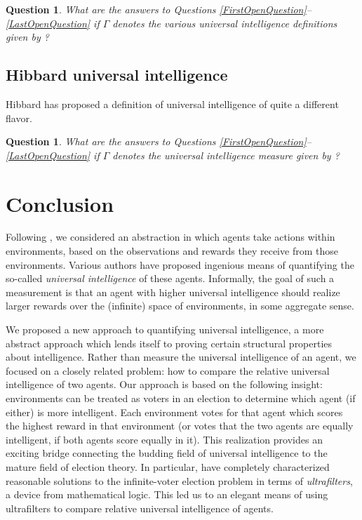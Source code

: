 \documentclass[twoside,11pt]{article}
\newtheorem{question}[theorem]{Question}
\begin{document}
\begin{question}
    What are the answers to Questions \ref{FirstOpenQuestion}--\ref{LastOpenQuestion}
    if $\varGamma$ denotes the various universal intelligence definitions
    given by \citet{hernandez}?
\end{question}


\subsection{Hibbard universal intelligence}

Hibbard has proposed \citep{hibbard} a definition of universal intelligence
of quite a different flavor.

\begin{question}
\label{ReallyLastOpenquestion}
    What are the answers to Questions \ref{FirstOpenQuestion}--\ref{LastOpenQuestion}
    if $\varGamma$ denotes the universal intelligence measure given by
    \citet{hibbard}?
\end{question}

\section{Conclusion}

Following \citet{hutter2007}, we considered an abstraction in
which agents take actions within environments, based on the observations and
rewards they receive from those environments. Various authors
\citep{hutter2007, hernandez, hibbard} have proposed
ingenious means of quantifying the so-called \emph{universal intelligence}
of these agents.
Informally, the goal of such a measurement is that
an agent with higher universal intelligence should realize larger rewards
over the (infinite) space of environments, in some aggregate
sense.

We proposed a new approach to quantifying universal intelligence, a more
abstract approach which lends itself to proving certain structural properties
about intelligence. Rather than measure the universal intelligence of an
agent, we focused on a closely related problem: how to compare the relative
universal intelligence of two agents. Our approach is based on the following
insight: environments can be treated as voters in an election to determine
which agent (if either) is more intelligent. Each environment votes for that
agent which scores the highest reward in that environment (or votes that the
two agents are equally intelligent, if both agents score equally in it).
This realization provides an exciting bridge connecting the budding field of
universal intelligence to
the mature field of election theory.
In particular,
\citet{kirman} have completely characterized
reasonable solutions to the infinite-voter election problem in terms of \emph{ultrafilters},
a device from mathematical logic. This led us to an elegant means
of using ultrafilters to compare relative universal intelligence of agents.
\end{document}
